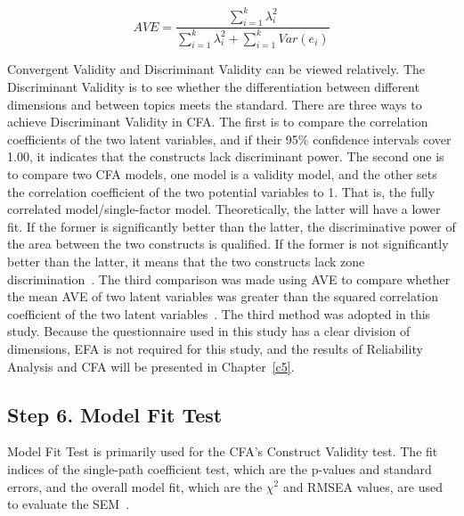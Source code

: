 \begin{equation}
\label{for5}
AVE = \frac{\sum_{i=1}^{k} \lambda_i^2 }{\sum_{i=1}^{k} \lambda_i^2+\sum_{i=1}^{k} Var(e_i)}
\end{equation}

Convergent Validity and Discriminant Validity can be viewed relatively. The Discriminant Validity is to see whether the differentiation between different dimensions and between topics meets the standard. There are three ways to achieve Discriminant Validity in CFA. The first is to compare the correlation coefficients of the two latent variables, and if their 95\% confidence intervals cover 1.00, it indicates that the constructs lack discriminant power. The second one is to compare two CFA models, one model is a validity model, and the other sets the correlation coefficient of the two potential variables to 1. That is, the fully correlated model/single-factor model. Theoretically, the latter will have a lower fit. If the former is significantly better than the latter, the discriminative power of the area between the two constructs is qualified. If the former is not significantly better than the latter, it means that the two constructs lack zone discrimination~\cite{ref34,ref35}. The third comparison was made using AVE to compare whether the mean AVE of two latent variables was greater than the squared correlation coefficient of the two latent variables~\cite{ref31}. The third method was adopted in this study. Because the questionnaire used in this study has a clear division of dimensions, EFA is not required for this study, and the results of Reliability Analysis and CFA will be presented in Chapter~\ref{c5}.


\subsection{Step 6. Model Fit Test}
Model Fit Test is primarily used for the CFA's Construct Validity test. The fit indices of the single-path coefficient test, which are the p-values and standard errors, and the overall model fit, which are the $\chi^2$ and RMSEA values, are used to evaluate the SEM~\cite{ref16}.


